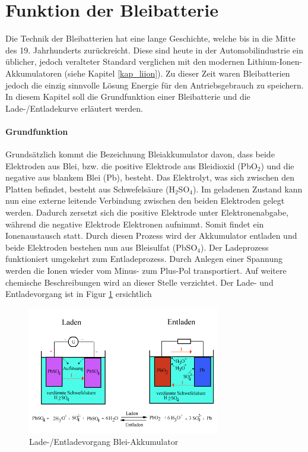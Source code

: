 \section{Funktion der Bleibatterie}

Die Technik der Bleibatterien hat eine lange Geschichte, welche bis in die Mitte des 19. Jahrhunderts zurückreicht. Diese sind heute in der Automobilindustrie ein üblicher, jedoch veralteter Standard verglichen mit den modernen Lithium-Ionen-Akkumulatoren (siehe Kapitel \ref{kap_liion}). Zu dieser Zeit waren Bleibatterien jedoch die einzig sinnvolle Lösung Energie für den Antriebsgebrauch zu speichern. In diesem Kapitel soll die Grundfunktion einer Bleibatterie und die Lade-/Entladekurve erläutert werden.

\paragraph{Grundfunktion}
Grundsätzlich kommt die Bezeichnung Bleiakkumulator davon, dass beide Elektroden aus Blei, bzw. die positive Elektrode aus Bleidioxid (PbO$_2$) und die negative aus blankem Blei (Pb), besteht. Das Elektrolyt, was sich zwischen den Platten befindet, besteht aus Schwefelsäure (H$_2$SO$_4$). Im geladenen Zustand kann nun eine externe leitende Verbindung zwischen den beiden Elektroden gelegt werden. Dadurch zersetzt sich die positive Elektrode unter Elektronenabgabe, während die negative Elektrode Elektronen aufnimmt. Somit findet ein Ionenaustausch statt. Durch diesen Prozess wird der Akkumulator entladen und beide Elektroden bestehen nun aus Bleisulfat (PbSO$_4$). Der Ladeprozess funktioniert umgekehrt zum Entladeprozess. Durch Anlegen einer Spannung werden die Ionen wieder vom Minus- zum Plus-Pol transportiert. Auf weitere chemische Beschreibungen wird an dieser Stelle verzichtet. Der Lade- und Entladevorgang ist in Figur \ref{fig:pb_akku} ersichtlich \cite{pb_akku_funktion1} \cite{pb_akku_funktion2}

\begin{figure}[h!]
	\centering
		\includegraphics[width=0.75\textwidth]{images/pb_akku.PNG}
	\caption{Lade-/Entladevorgang Blei-Akkumulator \cite{pb_akku_ent_lade}}
	\label{fig:pb_akku}
\end{figure}

